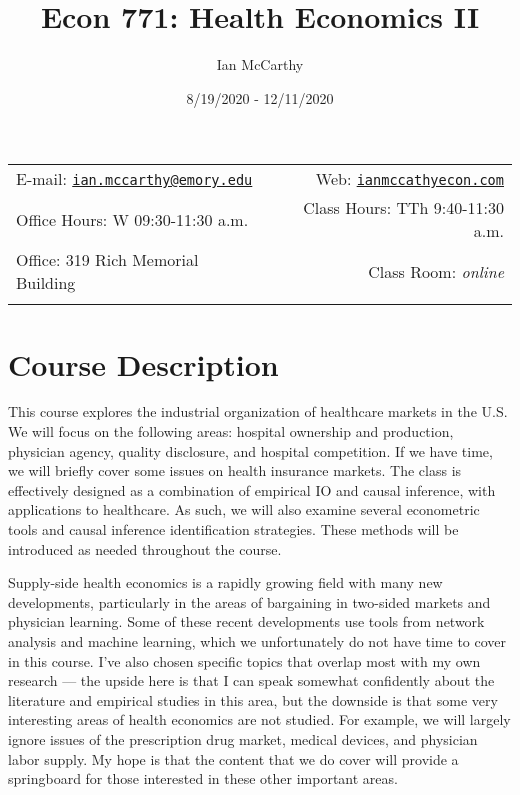 \documentclass[11pt,]{article}
\title{Econ 771: Health Economics II}
\author{Ian McCarthy}
\date{8/19/2020 - 12/11/2020}
\begin{document}
  

		\maketitle
		
	
		\thispagestyle{firststyle}



	\noindent \begin{tabular*}{\textwidth}{ @{\extracolsep{\fill}} lr @{\extracolsep{\fill}}}


E-mail: \texttt{\href{mailto:ian.mccarthy@emory.edu}{\nolinkurl{ian.mccarthy@emory.edu}}} & Web: \href{http://ianmccathyecon.com}{\tt ianmccathyecon.com}\\
Office Hours: W 09:30-11:30 a.m.  &  Class Hours: TTh 9:40-11:30 a.m.\\
Office: 319 Rich Memorial Building  & Class Room: \emph{online}\\
	&  \\
	\hline
	\end{tabular*}
	
\vspace{2mm}
	


\hypertarget{course-description}{%
\section{Course Description}\label{course-description}}

This course explores the industrial organization of healthcare markets
in the U.S. We will focus on the following areas: hospital ownership and
production, physician agency, quality disclosure, and hospital
competition. If we have time, we will briefly cover some issues on
health insurance markets. The class is effectively designed as a
combination of empirical IO and causal inference, with applications to
healthcare. As such, we will also examine several econometric tools and
causal inference identification strategies. These methods will be
introduced as needed throughout the course.

Supply-side health economics is a rapidly growing field with many new
developments, particularly in the areas of bargaining in two-sided
markets and physician learning. Some of these recent developments use
tools from network analysis and machine learning, which we unfortunately
do not have time to cover in this course. I've also chosen specific
topics that overlap most with my own research --- the upside here is
that I can speak somewhat confidently about the literature and empirical
studies in this area, but the downside is that some very interesting
areas of health economics are not studied. For example, we will largely
ignore issues of the prescription drug market, medical devices, and
physician labor supply. My hope is that the content that we do cover
will provide a springboard for those interested in these other important
areas.
\end{document}
